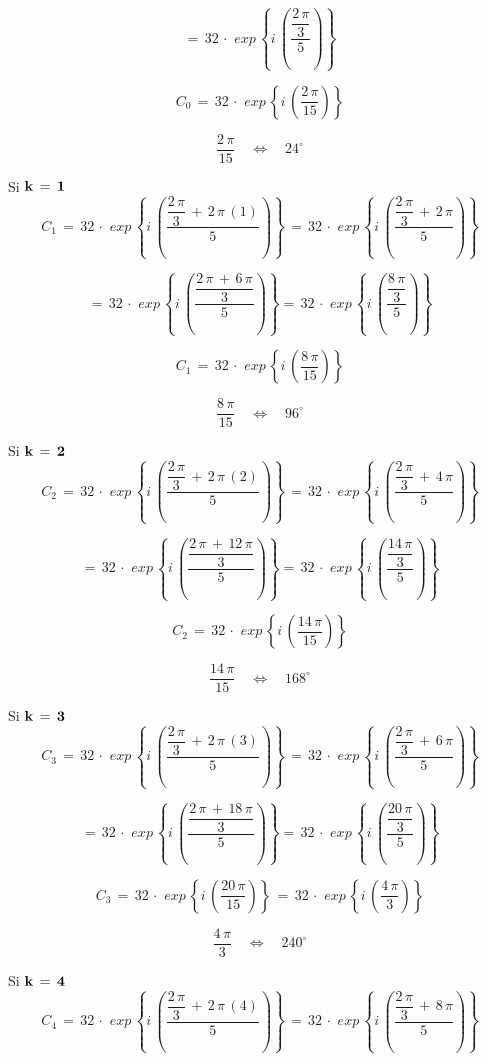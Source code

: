 \documentclass[a4paper,11pt,openany]{book}
\begin{document}
$$=\,32\,\cdot\,\,exp\,\left\{i\,\left(\dfrac{\dfrac{2\,\pi}{3}}{5}\right)\right\}$$

$$C_{0}\,=\,32\,\cdot\,\,exp\,\left\{i\,\left(\dfrac{2\,\pi}{15}\right)\right\}$$

$$\dfrac{2\,\pi}{15} \quad\iff\quad 24^\circ$$

\textcolor{ao(english)}{} Si $\bf{k\,=\,1}$
$$C_{1}\,=\,32\,\cdot\,\,exp\,\left\{i\,\left(\dfrac{\dfrac{2\,\pi}{3}\,+\,2\,\pi\,(1)}{5}\right)\right\}\,=\,32\,\cdot\,\,exp\,\left\{i\,\left(\dfrac{\dfrac{2\,\pi}{3}\,+\,2\,\pi}{5}\right)\right\}$$

$$=\,32\,\cdot\,\,exp\,\left\{i\,\left(\dfrac{\dfrac{2\,\pi\,+\,6\,\pi}{3}}{5}\right)\right\}=\,32\,\cdot\,\,exp\,\left\{i\,\left(\dfrac{\dfrac{8\,\pi}{3}}{5}\right)\right\}$$

$$C_{1}\,=\,32\,\cdot\,\,exp\,\left\{i\,\left(\dfrac{8\,\pi}{15}\right)\right\}$$

$$\dfrac{8\,\pi}{15} \quad\iff\quad 96^\circ$$

\textcolor{ao(english)}{} Si $\bf{k\,=\,2}$
$$C_{2}\,=\,32\,\cdot\,\,exp\,\left\{i\,\left(\dfrac{\dfrac{2\,\pi}{3}\,+\,2\,\pi\,(2)}{5}\right)\right\}\,=\,32\,\cdot\,\,exp\,\left\{i\,\left(\dfrac{\dfrac{2\,\pi}{3}\,+\,4\,\pi}{5}\right)\right\}$$

$$=\,32\,\cdot\,\,exp\,\left\{i\,\left(\dfrac{\dfrac{2\,\pi\,+\,12\,\pi}{3}}{5}\right)\right\}=\,32\,\cdot\,\,exp\,\left\{i\,\left(\dfrac{\dfrac{14\,\pi}{3}}{5}\right)\right\}$$

$$C_{2}\,=\,32\,\cdot\,\,exp\,\left\{i\,\left(\dfrac{14\,\pi}{15}\right)\right\}$$

$$\dfrac{14\,\pi}{15} \quad\iff\quad 168^\circ$$

\textcolor{ao(english)}{} Si $\bf{k\,=\,3}$
$$C_{3}\,=\,32\,\cdot\,\,exp\,\left\{i\,\left(\dfrac{\dfrac{2\,\pi}{3}\,+\,2\,\pi\,(3)}{5}\right)\right\}\,=\,32\,\cdot\,\,exp\,\left\{i\,\left(\dfrac{\dfrac{2\,\pi}{3}\,+\,6\,\pi}{5}\right)\right\}$$

$$=\,32\,\cdot\,\,exp\,\left\{i\,\left(\dfrac{\dfrac{2\,\pi\,+\,18\,\pi}{3}}{5}\right)\right\}=\,32\,\cdot\,\,exp\,\left\{i\,\left(\dfrac{\dfrac{20\,\pi}{3}}{5}\right)\right\}$$

$$C_{3}\,=\,32\,\cdot\,\,exp\,\left\{i\,\left(\dfrac{20\,\pi}{15}\right)\right\}\,=\,32\,\cdot\,\,exp\,\left\{i\,\left(\dfrac{4\,\pi}{3}\right)\right\}$$

$$\dfrac{4\,\pi}{3} \quad\iff\quad 240^\circ$$

\textcolor{ao(english)}{} Si $\bf{k\,=\,4}$
$$C_{4}\,=\,32\,\cdot\,\,exp\,\left\{i\,\left(\dfrac{\dfrac{2\,\pi}{3}\,+\,2\,\pi\,(4)}{5}\right)\right\}\,=\,32\,\cdot\,\,exp\,\left\{i\,\left(\dfrac{\dfrac{2\,\pi}{3}\,+\,8\,\pi}{5}\right)\right\}$$
\end{document}
